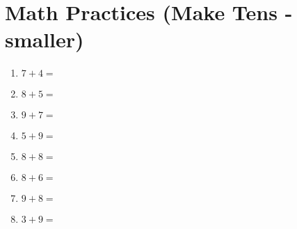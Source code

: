 \documentclass[a4paper,12pt]{article}
\begin{document}
\section*{\huge \center\textbf{Math Practices (Make Tens - smaller)}}
\vspace{1 cm}
\begin{multicols}{2}
\begin{enumerate}[label=\arabic*.]
    \item \textbf{\Large $7 + 4 =$} \underline{\hspace{2cm}} \vspace{1.5 cm}
    \item \textbf{\Large $8 + 5 =$} \underline{\hspace{2cm}} \vspace{1.5cm}
    \item \textbf{\Large $9 + 7 =$} \underline{\hspace{2cm}} \vspace{1.5cm}
    \item \textbf{\Large $5 + 9 =$} \underline{\hspace{2cm}} \vspace{1.5cm}
    \item \textbf{\Large $8 + 8 =$} \underline{\hspace{2cm}} \vspace{1.5cm}
    \item \textbf{\Large $8 + 6 =$} \underline{\hspace{2cm}} \vspace{1.5cm}
    \item \textbf{\Large $9 + 8 =$} \underline{\hspace{2cm}} \vspace{1.5cm}
    \item \textbf{\Large $3 + 9 =$} \underline{\hspace{2cm}} \vspace{1.5cm} %

\end{enumerate}
\end{multicols}
\end{document}
